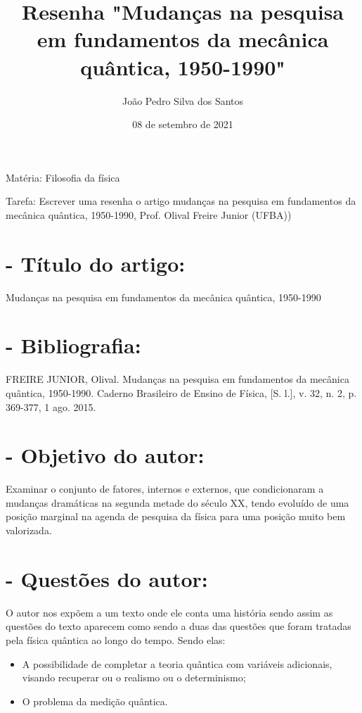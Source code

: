 \documentclass [a4paper, 12pt]{article}
\title{Resenha "Mudanças na pesquisa em fundamentos da mecânica quântica, 1950-1990"}
\author{João Pedro Silva dos Santos}
\date{08 de setembro de 2021}
\begin{document}
\maketitle

Matéria: Filosofia da física

Tarefa: Escrever uma resenha o artigo mudanças na pesquisa em fundamentos da mecânica quântica, 1950-1990, Prof. Olival Freire Junior (UFBA))

\section*{-  Título do artigo:}

Mudanças na pesquisa em fundamentos da mecânica quântica, 1950-1990

\section*{-  Bibliografia:}

FREIRE JUNIOR, Olival. Mudanças na pesquisa em fundamentos da mecânica quântica, 1950-1990. Caderno Brasileiro de Ensino de Física, [S. l.], v. 32, n. 2, p. 369-377, 1 ago. 2015.


\section*{- Objetivo do autor:}

Examinar o conjunto de fatores, internos e externos, que condicionaram a mudanças dramáticas na segunda metade do século XX, tendo evoluído de uma posição marginal na agenda de pesquisa da física para uma posição muito bem valorizada.

\section*{- Questões do autor:}

O autor nos expõem a um texto onde ele conta uma história sendo assim as questões do texto aparecem como sendo a duas das questões que foram tratadas pela física quântica ao longo do tempo. Sendo elas:

\begin{itemize}
    \item A possibilidade de completar a teoria quântica com variáveis adicionais, visando recuperar ou o realismo ou o determinismo;
    \item O problema da medição quântica.
\end{itemize}
\end{document}
